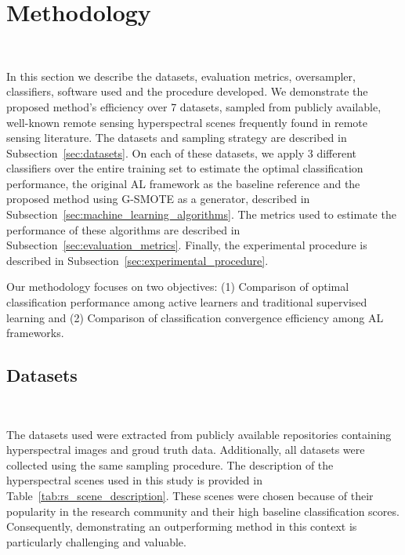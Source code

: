 \documentclass[remotesensing,article,submit,moreauthors,pdftex]{Definitions/mdpi}
\begin{document}
\section{Methodology}~\label{sec:methodology}

In this section we describe the datasets, evaluation metrics, oversampler,
classifiers, software used and the procedure developed. We demonstrate the
proposed method's efficiency over 7 datasets, sampled from publicly available,
well-known remote sensing hyperspectral scenes frequently found in remote
sensing literature. The datasets and sampling strategy are described in
Subsection~\ref{sec:datasets}. On each of these datasets, we apply 3 different
classifiers over the entire training set to estimate the optimal
classification performance, the original AL framework as the baseline
reference and the proposed method using G-SMOTE as a generator, described in
Subsection~\ref{sec:machine_learning_algorithms}. The metrics used to estimate
the performance of these algorithms are described in
Subsection~\ref{sec:evaluation_metrics}. Finally, the experimental procedure
is described in Subsection~\ref{sec:experimental_procedure}. 

Our methodology focuses on two objectives: (1) Comparison of optimal
classification performance among active learners and traditional supervised
learning and (2) Comparison of classification convergence efficiency among AL
frameworks.

\subsection{Datasets}~\label{sec:datasets}

The datasets used were extracted from publicly available repositories
containing hyperspectral images and groud truth data. Additionally, all
datasets were collected using the same sampling procedure. The description of
the hyperspectral scenes used in this study is provided in
Table~\ref{tab:rs_scene_description}. These scenes were chosen because of
their popularity in the research community and their high baseline
classification scores. Consequently, demonstrating an outperforming method in
this context is particularly challenging and valuable.
\end{document}
